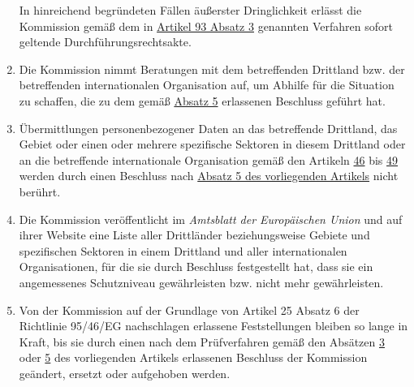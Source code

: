 \begin{enumerate}
   In hinreichend begründeten Fällen äußerster Dringlichkeit erlässt die Kommission gemäß dem in \hyperref[itm:93-3]
   {Artikel 93 Absatz 3} genannten Verfahren sofort geltende Durchführungsrechtsakte.

  \item Die Kommission nimmt Beratungen mit dem betreffenden Drittland bzw. der betreffenden internationalen
   Organisation auf, um Abhilfe für die Situation zu schaffen, die zu dem gemäß \hyperref[itm:45-5]{Absatz 5}
   erlassenen Beschluss geführt hat.
  \label{itm:45-6}

  \item Übermittlungen personenbezogener Daten an das betreffende Drittland, das Gebiet oder einen oder mehrere
   spezifische Sektoren in diesem Drittland oder an die betreffende internationale Organisation gemäß den Artikeln
   \hyperref[ch:46]{46} bis \hyperref[ch:49]{49} werden durch einen Beschluss nach \hyperref[itm:45-5]{Absatz 5 des
    vorliegenden Artikels} nicht berührt.
  \label{itm:45-7}

  \item Die Kommission veröffentlicht im \emph{Amtsblatt der Europäischen Union} und auf ihrer Website eine Liste aller
   Drittländer beziehungsweise Gebiete und spezifischen Sektoren in einem Drittland und aller internationalen
   Organisationen, für die sie durch Beschluss festgestellt hat, dass sie ein angemessenes Schutzniveau gewährleisten
   bzw. nicht mehr gewährleisten.   
  \label{itm:45-8}

  \item Von der Kommission auf der Grundlage von Artikel 25 Absatz 6 der Richtlinie 95/46/EG\todo
   {nachschlagen} erlassene Feststellungen bleiben so lange in Kraft, bis sie durch einen nach dem Prüfverfahren gemäß
   den Absätzen \hyperref[itm:45-3]{3} oder \hyperref[itm:45-5]{5} des vorliegenden Artikels erlassenen Beschluss der
   Kommission geändert, ersetzt oder aufgehoben werden.
  \label{itm:45-9}

\end{enumerate}


